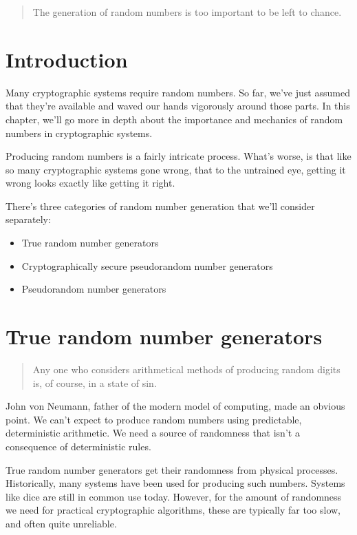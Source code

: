 \documentclass[11pt,ebook,table,dvipsnames]{memoir}
\begin{document}
\begin{quotation}
The generation of random numbers is too important to be left to chance.
\end{quotation}

\section{Introduction}
\label{sec-2-10-1}

Many cryptographic systems require random numbers. So far, we've just
assumed that they're available and waved our hands vigorously around
those parts. In this chapter, we'll go more in depth about the
importance and mechanics of random numbers in cryptographic systems.

Producing random numbers is a fairly intricate process. What's worse,
is that like so many cryptographic systems gone wrong, that to the
untrained eye, getting it wrong looks exactly like getting it right.

There's three categories of random number generation that we'll
consider separately:

\begin{itemize}
\item True random number generators
\item Cryptographically secure pseudorandom number generators
\item Pseudorandom number generators
\end{itemize}
\section{True random number generators}
\label{sec-2-10-2}

\begin{quotation}
Any one who considers arithmetical methods of producing random digits
is, of course, in a state of sin.
\end{quotation}

John von Neumann, father of the modern model of computing, made an
obvious point. We can't expect to produce random numbers using
predictable, deterministic arithmetic. We need a source of randomness
that isn't a consequence of deterministic rules.

True random number generators get their randomness from physical
processes. Historically, many systems have been used for producing
such numbers. Systems like dice are still in common use today.
However, for the amount of randomness we need for practical
cryptographic algorithms, these are typically far too slow, and often
quite unreliable.
\end{document}
